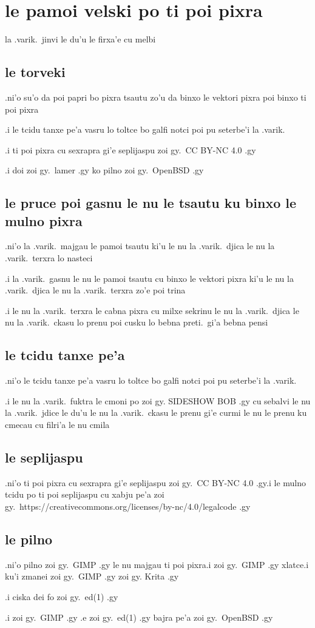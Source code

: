 \documentclass{report}
\begin{document}
\section{le pamoi velski po ti poi pixra}
la .varik.\ jinvi le du'u le firxa'e cu melbi
\subsection{le torveki}
.ni'o su'o da poi papri bo pixra tsautu zo'u da binxo le vektori pixra poi binxo ti poi pixra

.i le tcidu tanxe pe'a vasru lo toltce bo galfi notci poi pu seterbe'i la .varik.

.i ti poi pixra cu sexrapra gi'e seplijaspu zoi gy.\ CC BY-NC 4.0 .gy

.i doi zoi gy.\ lamer .gy ko pilno zoi gy.\ OpenBSD .gy
\subsection{le pruce poi gasnu le nu le tsautu ku binxo le mulno pixra}
.ni'o la .varik.\ majgau le pamoi tsautu ki'u le nu la .varik.\ djica le nu la .varik.\ terxra lo nasteci

.i la .varik.\ gasnu le nu le pamoi tsautu cu binxo le vektori pixra ki'u le nu la .varik.\ djica le nu la .varik.\ terxra zo'e poi trina

.i le nu la .varik.\ terxra le cabna pixra cu milxe sekrinu le nu la .varik.\ djica le nu la .varik.\ ckasu lo prenu poi cusku lo bebna preti.\ gi'a bebna pensi
\subsection{le tcidu tanxe pe'a}
.ni'o le tcidu tanxe pe'a vasru lo toltce bo galfi notci poi pu seterbe'i la .varik.

.i le nu la .varik.\ fuktra le cmoni po zoi gy. SIDESHOW BOB .gy cu sebalvi le nu la .varik.\ jdice le du'u le nu la .varik.\ ckasu le prenu gi'e curmi le nu le prenu ku cmecau cu filri'a le nu cmila
\subsection{le seplijaspu}
.ni'o ti poi pixra cu sexrapra gi'e seplijaspu zoi gy.\ CC BY-NC 4.0 .gy\@ .i le mulno tcidu po ti poi seplijaspu cu xabju pe'a zoi gy.\ https://creativecommons.org/licenses/by-nc/4.0/legalcode .gy
\subsection{le pilno}
.ni'o pilno zoi gy.\ GIMP .gy le nu majgau ti poi pixra\@ .i  zoi gy.\ GIMP .gy xlatce\@ .i ku'i zmanei zoi gy.\ GIMP .gy zoi gy. Krita .gy

.i ciska dei fo zoi gy.\ ed(1) .gy

.i zoi gy.\ GIMP .gy .e zoi gy.\ ed(1) .gy bajra pe'a zoi gy.\ OpenBSD .gy
\end{document}
